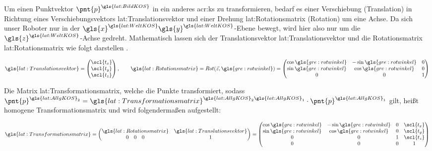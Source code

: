 Um einen Punktvektor \( \pnt{p}^{\gls{lat:BildKOS}} \) in ein anderes \gls{acr:ks} zu transformieren, bedarf es einer Verschiebung (Translation) in Richtung eines Verschiebungsvektors \gls{lat:Translationsvektor} und einer Drehung \gls{lat:Rotationsmatrix} (Rotation) um eine Achse. Da sich unser Roboter nur in der \(  \gls{x}^{\gls{lat:WeltKOS}} \gls{y}^{\gls{lat:WeltKOS}} \)-Ebene bewegt, wird hier also nur um die \( \gls{z}^{\gls{lat:WeltKOS}} \)-Achse gedreht.  
Mathematisch lassen sich der Translationsvektor \gls{lat:Translationsvektor} und die Rotationsmatrix \gls{lat:Rotationsmatrix} wie folgt darstellen \autocite{bajdRobotics2010}.

\begin{equation}
\gls{lat:Translationsvektor} = 
\begin{pmatrix}
\scl{t_x} 	\\
\scl{t_y} 	\\
\scl{t_z}     	\\
\end{pmatrix}
, \qquad
\gls{lat:Rotationsmatrix} = Rot(\vec{z},\gls{gre:rotwinkel}) = 
\begin{pmatrix}
\cos{\gls{gre:rotwinkel}} & -\sin{\gls{gre:rotwinkel}} & {0} 	\\
\sin{\gls{gre:rotwinkel}} & \cos{\gls{gre:rotwinkel}} & {0} 	\\
{0} & {0} & {1} 				    	\\
\end{pmatrix}
\end{equation} 		

Die Matrix \gls{lat:Transformationsmatrix}, welche die Punkte  transformiert, sodass 
\( \pnt{p}^{\gls{lat:AllgKOS}_2} = \gls{lat:Transformationsmatrix}^{\gls{lat:AllgKOS}_2\gls{lat:AllgKOS}_1} \cdot  \pnt{p}^{\gls{lat:AllgKOS}_1} \) gilt, heißt homogene Transformationsmatrix und wird folgendermaßen aufgestellt:

\begin{equation}
\gls{lat:Transformationsmatrix} = 
\begin{pmatrix}
\gls{lat:Rotationsmatrix} &  \gls{lat:Translationsvektor}	\\
0 \quad 0 \quad 0 & 1 	\\
\end{pmatrix}
=
\begin{pmatrix}
\cos{\gls{gre:rotwinkel}} & -\sin{\gls{gre:rotwinkel}} & {0} & \scl{t_x} 	\\
\sin{\gls{gre:rotwinkel}} & \cos{\gls{gre:rotwinkel}} & {0} & \scl{t_y} 	\\
{0} & {0} & {1} & \scl{t_z} 				    	\\
0 & 0 & 0 & 1 						\\
\end{pmatrix}
\end{equation}

